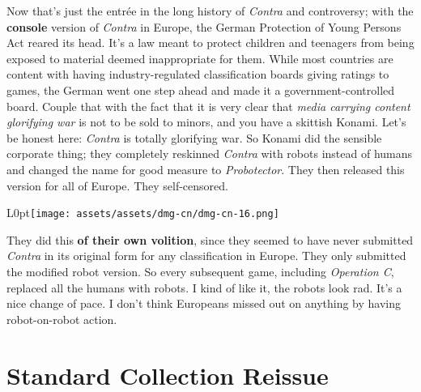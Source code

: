 \documentclass{book}
\begin{document}
Now that’s just the entrée in the long history of \emph{Contra} and controversy; with the \textbf{console} version of \emph{Contra} in Europe, the German Protection of Young Persons Act reared its head. It’s a law meant to protect children and teenagers from being exposed to material deemed inappropriate for them. While most countries are content with having industry-regulated classification boards giving ratings to games, the German went one step ahead and made it a government-controlled board. Couple that with the fact that it is very clear that \emph{media carrying content glorifying war} is not to be sold to minors, and you have a skittish Konami. Let’s be honest here: \emph{Contra} is totally glorifying war. So Konami did the sensible corporate thing; they completely reskinned \emph{Contra} with robots instead of humans and changed the name for good measure to \emph{Probotector}. They then released this version for all of Europe. They self-censored.\par
\begin{wrapfigure}{L}{0pt}{\texttt{[image: assets/assets/dmg-cn/dmg-cn-16.png]}}\end{wrapfigure}\noindent
They did this \textbf{of their own volition}, since they seemed to have never submitted \emph{Contra} in its original form for any classification in Europe. They only submitted the modified robot version. So every subsequent game, including \emph{Operation C}, replaced all the humans with robots. I kind of like it, the robots look rad. It’s a nice change of pace. I don’t think Europeans missed out on anything by having robot-on-robot action.\par
\FloatBarrier\section*{Standard Collection Reissue}
\FloatBarrier\vspace{\baselineskip}\centering
\begin{minipage}{0.45\linewidth}\end{minipage}\vspace{2pt}
\begin{minipage}{0.45\linewidth}\end{minipage}
\par\justifying
\end{document}

